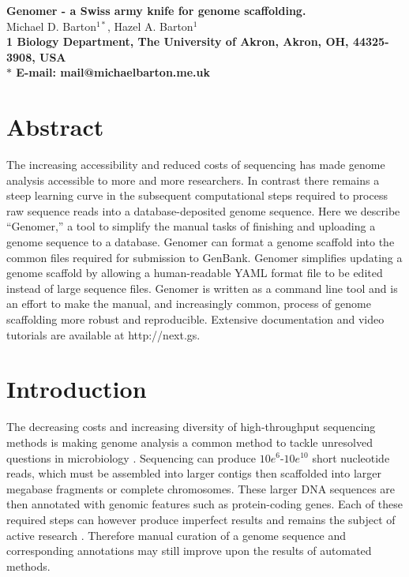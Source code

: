 \documentclass[10pt]{article}
\date{}
\begin{document}
\begin{flushleft}
{\Large
\textbf{Genomer - a Swiss army knife for genome scaffolding.}
}
\\
Michael D. Barton$^{1\ast}$, 
Hazel A. Barton$^{1}$
\\
\bf{1} Biology Department, The University of Akron, Akron, OH, 44325-3908, USA
\\
$\ast$ E-mail: mail@michaelbarton.me.uk
\end{flushleft}

\section*{Abstract}

The increasing accessibility and reduced costs of sequencing has made genome
analysis accessible to more and more researchers. In contrast there remains a
steep learning curve in the subsequent computational steps required to process
raw sequence reads into a database-deposited genome sequence. Here we describe
``Genomer,'' a tool to simplify the manual tasks of finishing and uploading a
genome sequence to a database. Genomer can format a genome scaffold into the
common files required for submission to GenBank. Genomer simplifies updating a
genome scaffold by allowing a human-readable YAML format file to be edited
instead of large sequence files. Genomer is written as a command line tool and
is an effort to make the manual, and increasingly common, process of genome
scaffolding more robust and reproducible. Extensive documentation and video
tutorials are available at http://next.gs.

\section*{Introduction}

The decreasing costs and increasing diversity of high-throughput sequencing
methods is making genome analysis a common method to tackle unresolved
questions in microbiology \cite{loman2012b}. Sequencing can produce
$10e^{6}$-$10e^{10}$ short nucleotide reads, which must be assembled into
larger contigs then scaffolded into larger megabase fragments or complete
chromosomes. These larger DNA sequences are then annotated with genomic
features such as protein-coding genes. Each of these required steps can however
produce imperfect results and remains the subject of active research
\cite{earl2011,quail2012,beckloff2012}. Therefore manual curation of a genome
sequence and corresponding annotations may still improve upon the results of
automated methods.
\end{document}
